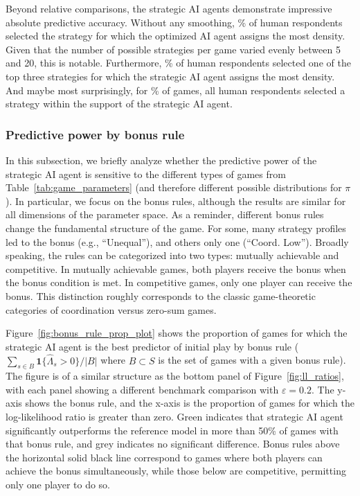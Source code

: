 \documentclass[11pt]{article}
\theoremstyle{definition}
\newcommand{\aisub}{AI agent}
\begin{document}
Beyond relative comparisons, the strategic \aisub{s} demonstrate impressive absolute predictive accuracy.
Without any smoothing, \OptHighestMatchRate\% of human respondents selected the strategy for which the optimized \aisub{} assigns the most density.
Given that the number of possible strategies per game varied evenly between 5 and 20, this is notable.
Furthermore, \OptTopThreeMatchRate\% of human respondents selected one of the top three strategies for which the strategic \aisub{} assigns the most density.
And maybe most surprisingly, for \OptGameAllMatchRate\% of games, all human respondents selected a strategy within the support of the strategic \aisub{}.

\subsubsection{Predictive power by bonus rule}

In this subsection, we briefly analyze whether the predictive power of the strategic \aisub{} is sensitive to the different types of games from Table~\ref{tab:game_parameters} (and therefore different possible distributions for $\pi$).
In particular, we focus on the bonus rules, although the results are similar for all dimensions of the parameter space.
As a reminder, different bonus rules change the fundamental structure of the game.
For some, many strategy profiles led to the bonus (e.g., ``Unequal''), and others only one (``Coord. Low'').
Broadly speaking, the rules can be categorized into two types: mutually achievable and competitive.
In mutually achievable games, both players receive the bonus when the bonus condition is met.
In competitive games, only one player can receive the bonus.
This distinction roughly corresponds to the classic game-theoretic categories of coordination versus zero-sum games.

Figure~\ref{fig:bonus_rule_prop_plot} shows the proportion of games for which the strategic \aisub{} is the best predictor of initial play by bonus rule ($\sum_{s \in B} \mathbf 1\{\hat \Lambda_s > 0\} / |B|$ where $B \subset S$ is the set of games with a given bonus rule).
The figure is of a similar structure as the bottom panel of Figure~\ref{fig:ll_ratios}, with each panel showing a different benchmark comparison with $\varepsilon = 0.2$.
The y-axis shows the bonus rule, and the x-axis is the proportion of games for which the log-likelihood ratio is greater than zero.
Green indicates that strategic \aisub{} significantly outperforms the reference model in more than 50\% of games with that bonus rule, and grey indicates no significant difference.
Bonus rules above the horizontal solid black line correspond to games where both players can achieve the bonus simultaneously, while those below are competitive, permitting only one player to do so.
\end{document}

